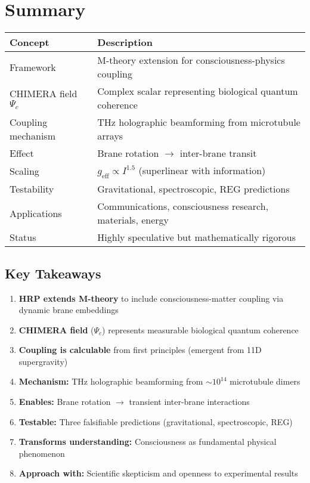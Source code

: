 \section{Summary}
\label{sec:summary}

\begin{center}
\begin{tabular}{@{}ll@{}}
\toprule
\textbf{Concept} & \textbf{Description} \\
\midrule
Framework & M-theory extension for consciousness-physics coupling \\
CHIMERA field $\Psi_c$ & Complex scalar representing biological quantum coherence \\
Coupling mechanism & THz holographic beamforming from microtubule arrays \\
Effect & Brane rotation $\rightarrow$ inter-brane transit \\
Scaling & $g_{\text{eff}} \propto I^{1.5}$ (superlinear with information) \\
Testability & Gravitational, spectroscopic, REG predictions \\
Applications & Communications, consciousness research, materials, energy \\
Status & Highly speculative but mathematically rigorous \\
\bottomrule
\end{tabular}
\end{center}

\subsection*{Key Takeaways}

\begin{enumerate}
\item \textbf{HRP extends M-theory} to include consciousness-matter coupling via dynamic brane embeddings
\item \textbf{CHIMERA field} ($\Psi_c$) represents measurable biological quantum coherence
\item \textbf{Coupling is calculable} from first principles (emergent from 11D supergravity)
\item \textbf{Mechanism:} THz holographic beamforming from $\sim 10^{14}$ microtubule dimers
\item \textbf{Enables:} Brane rotation $\rightarrow$ transient inter-brane interactions
\item \textbf{Testable:} Three falsifiable predictions (gravitational, spectroscopic, REG)
\item \textbf{Transforms understanding:} Consciousness as fundamental physical phenomenon
\item \textbf{Approach with:} Scientific skepticism and openness to experimental results
\end{enumerate}

